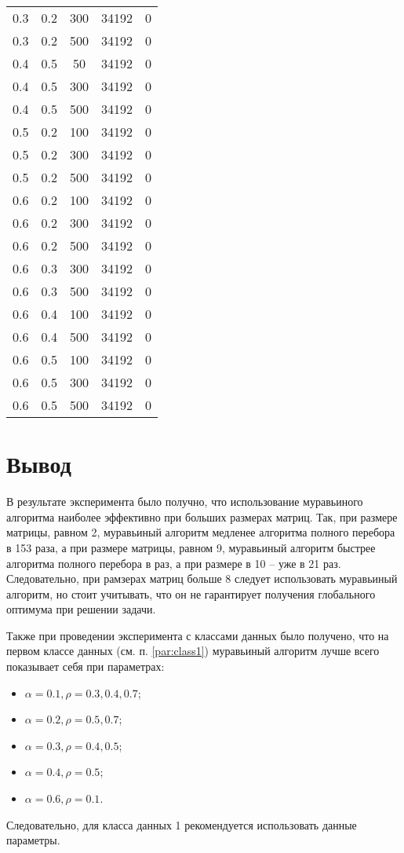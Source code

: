 \begin{center}
\begin{longtable}[c]{|c|c|c|c|c|}
		0.3 &  0.2 &  300 & 34192 &     0 \\
		0.3 &  0.2 &  500 & 34192 &     0 \\ \hline
		0.4 &  0.5 &   50 & 34192 &     0 \\
		0.4 &  0.5 &  300 & 34192 &     0 \\
		0.4 &  0.5 &  500 & 34192 &     0 \\ \hline
		0.5 &  0.2 &  100 & 34192 &     0 \\
		0.5 &  0.2 &  300 & 34192 &     0 \\
		0.5 &  0.2 &  500 & 34192 &     0 \\ \hline
		0.6 &  0.2 &  100 & 34192 &     0 \\
		0.6 &  0.2 &  300 & 34192 &     0 \\
		0.6 &  0.2 &  500 & 34192 &     0 \\ \hline
		0.6 &  0.3 &  300 & 34192 &     0 \\
		0.6 &  0.3 &  500 & 34192 &     0 \\ \hline
		0.6 &  0.4 &  100 & 34192 &     0 \\
		0.6 &  0.4 &  500 & 34192 &     0 \\ \hline
		0.6 &  0.5 &  100 & 34192 &     0 \\
		0.6 &  0.5 &  300 & 34192 &     0 \\
		0.6 &  0.5 &  500 & 34192 &     0 \\ \hline
	\end{longtable}
\end{center}

\section*{Вывод}

В результате эксперимента было получно, что использование муравьиного алгоритма наиболее эффективно при больших размерах матриц. Так, при размере матрицы, равном 2, муравьиный алгоритм медленее алгоритма полного перебора в 153 раза, а при размере матрицы, равном 9, муравьиный алгоритм быстрее алгоритма полного перебора в раз, а при размере в 10 -- уже в 21 раз. Следовательно, при рамзерах матриц больше 8 следует использовать муравьиный алгоритм, но стоит учитывать, что он не гарантирует получения глобального оптимума при решении задачи.

Также при проведении эксперимента с классами данных было получено, что на первом классе данных (см. п. \ref{par:class1}) муравьиный алгоритм лучше всего показывает себя при параметрах:
\begin{itemize}[label=---]
	\item $\alpha = 0.1, \rho = 0.3, 0.4, 0.7$;
	\item $\alpha = 0.2, \rho = 0.5, 0.7$;
	\item $\alpha = 0.3, \rho = 0.4, 0.5$;
	\item $\alpha = 0.4, \rho = 0.5$;
	\item $\alpha = 0.6, \rho = 0.1$.
\end{itemize}  
Следовательно, для класса данных 1 рекомендуется использовать данные параметры. 

